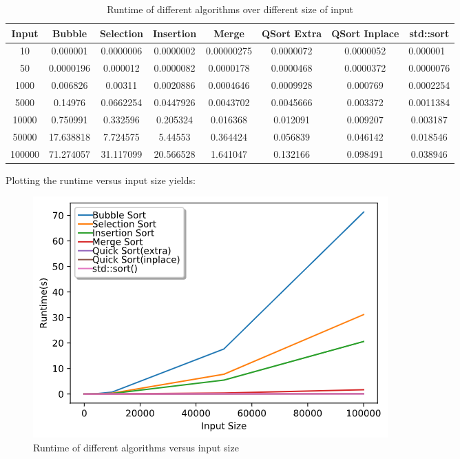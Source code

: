 \documentclass[a4paper]{article}
\begin{document}
    \begin{table}[H]
        \centering{}
        \begin{tabular}{|c|c|c|c|c|c|c|c|}
        \hline
        \rowcolor[HTML]{EFEFEF} 
        Input  & Bubble    & Selection & Insertion & Merge      & QSort Extra & QSort Inplace & std::sort \\ \hline
        10     & 0.000001  & 0.0000006 & 0.0000002 & 0.00000275 & 0.0000072   & 0.0000052     & \multicolumn{1}{l|}{0.000001}               \\ \hline
        50     & 0.0000196 & 0.000012  & 0.0000082 & 0.0000178  & 0.0000468   & 0.0000372     & 0.0000076                                   \\ \hline
        1000   & 0.006826  & 0.00311   & 0.0020886 & 0.0004646  & 0.0009928   & 0.000769      & 0.0002254                                   \\ \hline
        5000   & 0.14976   & 0.0662254 & 0.0447926 & 0.0043702  & 0.0045666   & 0.003372      & 0.0011384                                   \\ \hline
        10000  & 0.750991  & 0.332596  & 0.205324  & 0.016368   & 0.012091    & 0.009207      & 0.003187                                    \\ \hline
        50000  & 17.638818 & 7.724575  & 5.44553   & 0.364424   & 0.056839    & 0.046142      & 0.018546                                    \\ \hline
        100000 & 71.274057 & 31.117099 & 20.566528 & 1.641047   & 0.132166    & 0.098491      & 0.038946                                    \\ \hline
        \end{tabular}
        \caption{Runtime of different algorithms over different size of input}
    \end{table}
    Plotting the runtime versus input size yields:
    \begin{figure}[H]
        \centering{}
        \includegraphics[width = .65\textwidth]{Figures/fig1.png}
        \centering
        \caption{Runtime of different algorithms versus input size}
    \end{figure}
\end{document}

